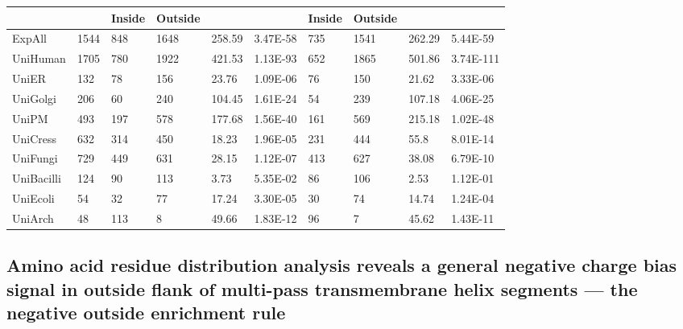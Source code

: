\begin{table}[htbp!]
{\begin{tabular}{p{5em}lllllllll}
 \cmidrule{3-4}\cmidrule{7-8}    \multicolumn{1}{c}{} &       & \multicolumn{1}{p{5em}}{\textbf{Inside}} & \multicolumn{1}{p{5em}}{\textbf{Outside}} &       &       & \multicolumn{1}{p{5em}}{\textbf{Inside}} & \multicolumn{1}{p{5em}}{\textbf{Outside}} &       &  \\
     \midrule
     ExpAll & 1544  & 848   & 1648  & 258.59 & 3.47E-58 & 735   & 1541  & 262.29 & 5.44E-59 \\
     \midrule
     UniHuman & 1705  & 780   & 1922  & 421.53 & 1.13E-93 & 652   & 1865  & 501.86 & 3.74E-111 \\
     \midrule
     UniER & 132   & 78    & 156   & 23.76 & 1.09E-06 & 76    & 150   & 21.62 & 3.33E-06 \\
     \midrule
     UniGolgi & 206   & 60    & 240   & 104.45 & 1.61E-24 & 54    & 239   & 107.18 & 4.06E-25 \\
     \midrule
     UniPM & 493   & 197   & 578   & 177.68 & 1.56E-40 & 161   & 569   & 215.18 & 1.02E-48 \\
     \midrule
     UniCress & 632   & 314   & 450   & 18.23 & 1.96E-05 & 231   & 444   & 55.8  & 8.01E-14 \\
     \midrule
     UniFungi & 729   & 449   & 631   & 28.15 & 1.12E-07 & 413   & 627   & 38.08 & 6.79E-10 \\
     \midrule
     UniBacilli & 124   & 90    & 113   & 3.73  & 5.35E-02 & 86    & 106   & 2.53  & 1.12E-01 \\
     \midrule
     UniEcoli & 54    & 32    & 77    & 17.24 & 3.30E-05 & 30    & 74    & 14.74 & 1.24E-04 \\
     \midrule
     UniArch & 48    & 113   & 8     & 49.66 & 1.83E-12 & 96    & 7     & 45.62 & 1.43E-11 \\
     \bottomrule
     \end{tabular}}%
     \label{table:negativeskewsinglepass}

    \end{table}%

\subsection{Amino acid residue distribution analysis reveals a general negative charge bias signal in outside flank of multi-pass transmembrane helix segments --- the negative outside enrichment rule}\label{section:negativeskewmultipass}

